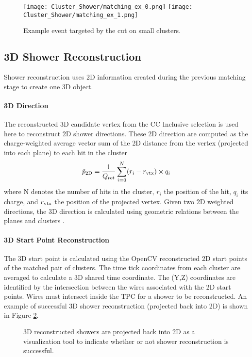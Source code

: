 \begin{figure}[H]
\centering
\texttt{[image: Cluster\_Shower/matching\_ex\_0.png]}
\texttt{[image: Cluster\_Shower/matching\_ex\_1.png]}
\caption{Example event targeted by the cut on small clusters.}
\label{fig:matching_ex_0}
\end{figure}


\subsection{3D Shower Reconstruction}
Shower reconstruction uses 2D information created during the previous matching stage to create one 3D object. 
\paragraph{3D Direction}  The reconstructed 3D candidate vertex from the CC Inclusive selection is used here to reconstruct 2D shower directions. These 2D direction are computed as the charge-weighted average vector sum of the 2D distance from the vertex (projected into each plane) to each hit in the cluster
\begin{equation}
  \hat{p}_{\rm 2D} = \frac{1}{Q_{tot}} \sum_{i=0}^{N} (r_i - r_{\rm vtx}) \times q_i 
\end{equation}
where N denotes the number of hits in the cluster, $r_i$ the position of the hit, $q_i$ its charge, and $r_{\rm vtx}$ the position of the projected vertex. Given two 2D weighted directions, the 3D direction is calculated using geometric relations between the planes and clusters \cite{bib:larliteGeoHelper}. 

\paragraph{3D Start Point Reconstruction} The 3D start point is calculated using the OpenCV reconstructed 2D start points of the matched pair of clusters. The time tick coordinates from each cluster are averaged to calculate a 3D shared time coordinate. The (Y,Z) coordinates are identified by the intersection between the wires associated with the 2D start points.  Wires must intersect inside the TPC for a shower to be reconstructed.  An example of successful 3D shower reconstruction (projected back into 2D) is shown in Figure \ref{fig:showers}.

\begin{figure}[h!] %
\centering
{}
\caption{3D reconstructed showers are projected back into 2D as a visualization tool to indicate whether or not shower reconstruction is successful. }
\label{fig:showers}
\end{figure}

